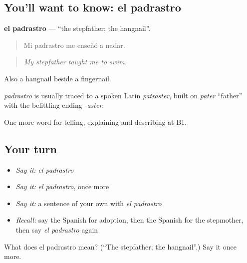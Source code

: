 \subsection*{You'll want to know: el padrastro}
\textbf{el padrastro} — \textquotedblleft{}the stepfather; the hangnail\textquotedblright{}.

\begin{quote}
Mi padrastro me enseñó a nadar.
\end{quote}

\begin{quote}
\emph{My stepfather taught me to swim.}
\end{quote}

Also a hangnail beside a fingernail.

\begin{cousinweb}
\emph{padrastro} is usually traced to a spoken Latin \emph{patraster}, built on \emph{pater} \textquotedblleft{}father\textquotedblright{} with the belittling ending \emph{-aster}.
\end{cousinweb}

\begin{grammarlens}[title={What you've built}]
One more word for telling, explaining and describing at B1.
\end{grammarlens}

\subsection*{Your turn}
\begin{itemize}
\raggedright
  \item \emph{Say it:} \emph{el padrastro}
  \item \emph{Say it:} \emph{el padrastro}, once more
  \item \emph{Say it:} a sentence of your own with \emph{el padrastro}
  \item \emph{Recall:} say the Spanish for adoption, then the Spanish for the stepmother, then say \emph{el padrastro} again
\end{itemize}

\begin{tcolorbox}[breakable,colback=teal!4,colframe=teal!35!black,title={Before you move on}]
What does el padrastro mean? (\textquotedblleft{}The stepfather; the hangnail\textquotedblright{}.) Say it once more.
\end{tcolorbox}
